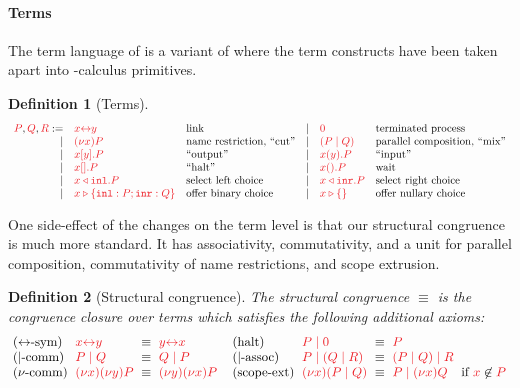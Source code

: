 \documentclass[draft,submission,copyright,creativecommons]{eptcs}
\newtheorem{definition}{Definition}
\begin{document}
\paragraph{Terms}
The term language of \hcp is a variant of \cp where the term constructs have
been taken apart into \textpi-calculus primitives.
\begin{definition}[Terms]\label{def:hcp-terms}
  \[
    \begin{array}{rllrll}
      \tm{P}, \tm{Q}, \tm{R}
           :=& \tm{\cpLink{x}{y}}         &\text{link}
      &  \mid& \tm{\piHalt}               &\text{terminated process}
      \\ \mid& \tm{\piNew{x}{P}}          &\text{name restriction, ``cut''}
      &  \mid& \tm{( \piPar{P}{Q} )}      &\text{parallel composition, ``mix''}
      \\ \mid& \tm{\piBoundSend{x}{y}{P}} &\text{``output''}
      &  \mid& \tm{\piRecv{x}{y}{P}}      &\text{``input''}
      \\ \mid& \tm{\piBoundSend{x}{}{P}}  &\text{``halt''}
      &  \mid& \tm{\cpWait{x}{}{P}}       &\text{wait}
      \\ \mid& \tm{\cpInl{x}{P}}          &\text{select left choice}
      &  \mid& \tm{\cpInr{x}{P}}          &\text{select right choice}
      \\ \mid& \tm{\cpCase{x}{P}{Q}}      &\text{offer binary choice}
      &  \mid& \tm{\cpAbsurd{x}}          &\text{offer nullary choice}
    \end{array}
  \]
\end{definition}\noindent
One side-effect of the changes on the term level is that our structural
congruence is much more standard. It has associativity, commutativity, and a
unit for parallel composition, commutativity of name restrictions, and scope
extrusion.
\begin{definition}[Structural congruence]\label{def:hcp-equiv}
  The structural congruence $\equiv$ is the congruence closure over terms which
  satisfies the following additional axioms:
  \[
    \setlength{\arraycolsep}{3pt}
    \begin{array}{llcllllcll}
        \cpEquivLinkComm
      & \tm{\cpLink{x}{y}}
      & \equiv
      & \tm{\cpLink{y}{x}}
      &
      &
        \hccpEquivMixHalt1
      & \tm{\piPar{P}{\piHalt}}
      & \equiv
      & \tm{P}
      &
      \\
        \hccpEquivMixComm
      & \tm{\piPar{P}{Q}}
      & \equiv
      & \tm{\piPar{Q}{P}}
      &
      &
        \hccpEquivMixAss1
      & \tm{\piPar{P}{( \piPar{Q}{R} )}}
      & \equiv
      & \tm{\piPar{( \piPar{P}{Q} )}{R}}
      &
      \\
        \hccpEquivNewComm
      & \tm{\piNew{x}{\piNew{y}{P}}}
      & \equiv
      & \tm{\piNew{y}{\piNew{x}{P}}}
      &
      &
        \hccpEquivScopeExt1
      & \tm{\piNew{x}{( \piPar{P}{Q} )}}
      & \equiv
      & \tm{\piPar{P}{\piNew{x}{Q}}}
      & \text{if }\notFreeIn{x}{P}
    \end{array}
  \]
\end{definition}\noindent
\end{document}
